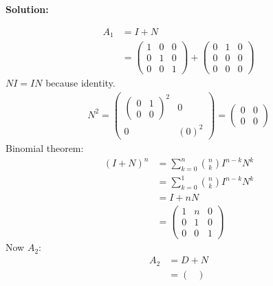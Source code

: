 \documentclass[12pt]{article}
\newenvironment{solution}{
    \textbf{Solution:}
    
}{
    
    \vspace{2em}
}
\begin{document}
\begin{solution}
    \[
        \begin{aligned}
            A_1 & = I + N\\
            &= \begin{pmatrix}
                1 & 0 & 0 \\
                0 & 1 & 0 \\
                0 & 0 & 1
            \end{pmatrix} + \begin{pmatrix}
                0 & 1 & 0 \\
                0 & 0 & 0 \\
                0 & 0 & 0
            \end{pmatrix}
        \end{aligned}
    \]
    \(NI = IN\) because identity.
    \[
        \begin{aligned}
            N^2 = \begin{pmatrix}
                \begin{pmatrix}
                    0 & 1 \\
                    0 & 0
                \end{pmatrix}^2 & 0 \\
                0 & (0)^2
            \end{pmatrix} = \begin{pmatrix}
                0 & 0 \\
                0 & 0
            \end{pmatrix}
        \end{aligned}
    \]
    Binomial theorem:
    \[
        \begin{aligned}
            (I + N)^n &= \sum_{k=0}^n \binom{n}{k} I^{n-k}N^k\\
            &= \sum_{k=0}^1 \binom{n}{k} I^{n-k}N^k\\
            &= I + nN\\
            &= \begin{pmatrix}
                1 & n & 0 \\
                0 & 1 & 0 \\
                0 & 0 & 1
            \end{pmatrix}
        \end{aligned}
    \]
    Now \(A_2\):
    \[
        \begin{aligned}
            A_2 &= D + N\\
            &= \begin{pmatrix}

\end{pmatrix}
\end{aligned}\]
\end{solution}
\end{document}
